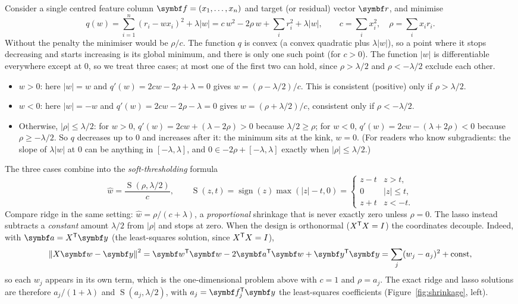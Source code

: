 \documentclass[11pt]{article}
\newcommand{\w}{\vect{w}}
\newcommand{\y}{\vect{y}}
\newcommand{\soft}{\operatorname{S}}
\newcommand{\vr}{\vect{r}}
\begin{document}
Consider a single centred feature column $\vect{f} = (x_1, \dots, x_n)$ and target (or residual) vector $\vr$, and
minimise
\[
  q(w) = \sum_{i=1}^n (r_i - w x_i)^2 + \lambda |w| = c\,w^2 - 2\rho\,w + \textstyle\sum_i r_i^2 + \lambda|w|,
  \qquad c = \sum_i x_i^2,\quad \rho = \sum_i x_i r_i .
\]
Without the penalty the minimiser would be $\rho/c$. The function $q$ is convex (a convex quadratic plus $\lambda|w|$),
so a point where it stops decreasing and starts increasing is its global minimum, and there is only one such point
(for $c > 0$). The function $|w|$ is differentiable everywhere except at $0$, so we treat three cases; at most one
of the first two can hold, since $\rho > \lambda/2$ and $\rho < -\lambda/2$ exclude each other.
\begin{itemize}
\item $w > 0$: here $|w| = w$ and $q'(w) = 2cw - 2\rho + \lambda = 0$ gives $w = (\rho - \lambda/2)/c$. This is consistent
(positive) only if $\rho > \lambda/2$.
\item $w < 0$: here $|w| = -w$ and $q'(w) = 2cw - 2\rho - \lambda = 0$ gives $w = (\rho + \lambda/2)/c$, consistent only
if $\rho < -\lambda/2$.
\item Otherwise, $|\rho| \le \lambda/2$: for $w > 0$, $q'(w) = 2cw + (\lambda - 2\rho) > 0$ because $\lambda/2 \ge \rho$;
for $w < 0$, $q'(w) = 2cw - (\lambda + 2\rho) < 0$ because $\rho \ge -\lambda/2$. So $q$ decreases up to $0$ and
increases after it: the minimum sits at the kink, $w = 0$. (For readers who know subgradients: the slope of
$\lambda|w|$ at $0$ can be anything in $[-\lambda, \lambda]$, and $0 \in -2\rho + [-\lambda, \lambda]$ exactly when
$|\rho| \le \lambda/2$.)
\end{itemize}
The three cases combine into the \emph{soft-thresholding} formula
\begin{equation}\label{eq:soft}
  \hat w = \frac{\soft(\rho, \lambda/2)}{c}, \qquad \soft(z, t) = \operatorname{sign}(z)\max(|z| - t, 0) =
  \begin{cases} z - t & z > t, \\ 0 & |z| \le t, \\ z + t & z < -t. \end{cases}
\end{equation}
Compare ridge in the same setting: $\hat w = \rho/(c + \lambda)$, a \emph{proportional} shrinkage that is never exactly
zero unless $\rho = 0$. The lasso instead subtracts a \emph{constant} amount $\lambda/2$ from $|\rho|$ and stops at zero.
When the design is orthonormal ($X^{\mathsf{T}} X = I$) the coordinates decouple. Indeed, with $\vect{a} = X\T\y$ (the
least-squares solution, since $X^{\mathsf{T}} X = I$),
\[
  \norm{X\w - \y}^2 = \w\T\w - 2\vect{a}\T\w + \y\T\y = \sum_j (w_j - a_j)^2 + \text{const},
\]
so each $w_j$ appears in its own term, which is the one-dimensional problem above with $c = 1$ and $\rho = a_j$. The
exact ridge and lasso solutions are therefore $a_j/(1 + \lambda)$ and $\soft(a_j, \lambda/2)$, with
$a_j = \vect{f}_j\T\y$ the least-squares coefficients (Figure~\ref{fig:shrinkage}, left).
\end{document}
